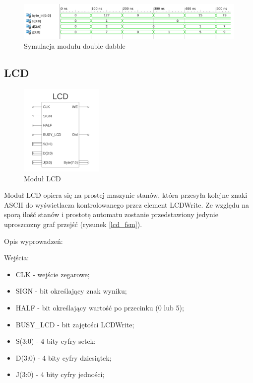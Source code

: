 \documentclass[a4paper]{article}
\begin{document}
\begin{figure}[H]
\begin{center}
\includegraphics[width=16cm]{graphics/double_dabble_symulation.png}
\end{center}
\caption{Symulacja modułu double dabble}
\label{double_dabble_symulation}
\end{figure}

\subsection{LCD}

\begin{figure}[H]
\begin{center}
\includegraphics[width=4cm]{graphics/lcd_sym.png}
\end{center}
\caption{Moduł LCD}
\label{lcd_sym}
\end{figure} 

Moduł LCD opiera się na prostej maszynie stanów, która przesyła kolejne znaki ASCII do wyświetlacza kontrolowanego przez element LCDWrite. Ze względu na sporą ilość stanów i prostotę automatu zostanie przedstawiony jedynie uproszcozny graf przejść (rysunek \ref{lcd_fsm}).


Opis wyprowadzeń:

Wejścia:
\begin{itemize}
\item CLK - wejście zegarowe;
\item SIGN - bit określający znak wyniku;
\item HALF - bit określający wartość po przecinku (0 lub 5);
\item BUSY\_LCD - bit zajętości LCDWrite;
\item S(3:0) - 4 bity cyfry setek;
\item D(3:0) - 4 bity cyfry dziesiątek;
\item J(3:0) - 4 bity cyfry jedności;
\end{itemize}
\end{document}
